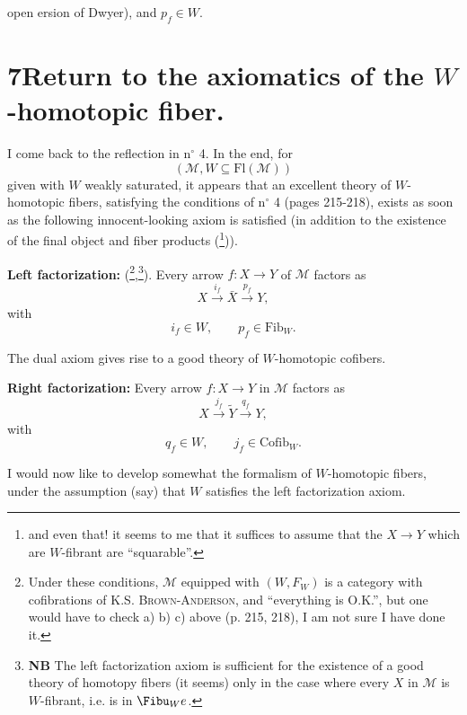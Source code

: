 
open ersion of Dwyer), and $p_f \in W$. %

\section*{7\quad Return to the axiomatics of the $W$-homotopic fiber.}

I come back to the reflection in n$^\circ$ 4. In the end, for
\[
(\mathcal{M}, W \subseteq \mathrm{Fl}(\mathcal{M}))
\]
given with $W$ weakly saturated, it appears that an excellent theory of $W$-homotopic fibers, satisfying the conditions  of n$^\circ$ 4 (pages 215-218), exists as soon as the following innocent-looking axiom is satisfied (in addition to the existence of the final object and fiber products (\footnote[128]{and even that! it seems to me that it suffices to assume that the $X \longrightarrow Y$ which are $W$-fibrant are ``squarable''.})).

\textbf{Left factorization:} (\footnote[129]{Under these conditions, $\mathcal{M}$ equipped with $(W, F_W)$ is a category with cofibrations of K.S. \textsc{Brown-Anderson}, and ``everything is O.K.'', but one would have to check a) b) c) above (p. 215, 218), I am not sure I have done it.},\footnote[130]{\textbf{NB} The left factorization axiom is sufficient for the existence of a good theory of homotopy fibers (it seems) only in the case where every $X$ in $\mathcal{M}$ is $W$-fibrant, i.e. is in $\Fibu_W e$.}). Every arrow $f : X \longrightarrow Y$ of $\mathcal{M}$ factors as
\[
X \xrightarrow{i_f} \bar{X} \xrightarrow{p_f} Y,
\]
with
\[
i_f \in W, \qquad p_f \in \mathrm{Fib}_W.
\]

The dual axiom gives rise to a good theory of $W$-homotopic cofibers.

\textbf{Right factorization:} Every arrow $f : X \longrightarrow Y$ in $\mathcal{M}$ factors as
\[
X \xrightarrow{j_f} \tilde{Y} \xrightarrow{q_f} Y,
\]
with
\[
q_f \in W, \qquad j_f \in \mathrm{Cofib}_W.
\]

I would now like to develop somewhat the formalism of $W$-homotopic fibers, under the assumption (say) that $W$ satisfies the left factorization axiom.

